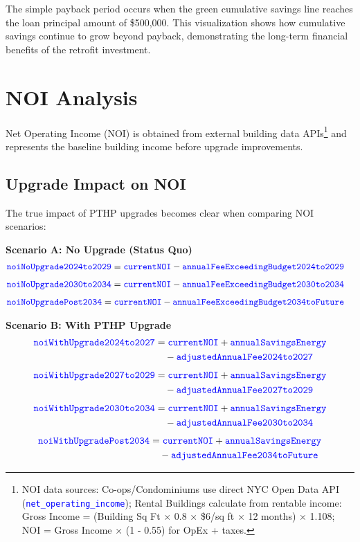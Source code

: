 \documentclass{article}
\newcommand{\code}[1]{\textcolor{blue}{\texttt{#1}}}
\begin{document}
The simple payback period occurs when the green cumulative savings line reaches the loan principal amount of \$500,000. This visualization shows how cumulative savings continue to grow beyond payback, demonstrating the long-term financial benefits of the retrofit investment.

\section{NOI Analysis}

Net Operating Income (NOI) is obtained from external building data APIs\footnote{NOI data sources: Co-ops/Condominiums use direct NYC Open Data API (\code{net\_operating\_income}); Rental Buildings calculate from rentable income: Gross Income = (Building Sq Ft × 0.8 × \$6/sq ft × 12 months) × 1.108; NOI = Gross Income × (1 - 0.55) for OpEx + taxes.} and represents the baseline building income before upgrade improvements.

\subsection{Upgrade Impact on NOI}

The true impact of PTHP upgrades becomes clear when comparing NOI scenarios:

\textbf{Scenario A: No Upgrade (Status Quo)}
\begin{align}
\code{noiNoUpgrade2024to2029} &= \code{currentNOI} - \code{annualFeeExceedingBudget2024to2029}
\end{align}
\begin{align}
\code{noiNoUpgrade2030to2034} &= \code{currentNOI} - \code{annualFeeExceedingBudget2030to2034}
\end{align}
\begin{align}
\code{noiNoUpgradePost2034} &= \code{currentNOI} - \code{annualFeeExceedingBudget2034toFuture}
\end{align}

\textbf{Scenario B: With PTHP Upgrade}
\begin{align}
\code{noiWithUpgrade2024to2027} &= \code{currentNOI} + \code{annualSavingsEnergy} \nonumber\\
&\quad - \code{adjustedAnnualFee2024to2027}
\end{align}
\begin{align}
\code{noiWithUpgrade2027to2029} &= \code{currentNOI} + \code{annualSavingsEnergy} \nonumber\\
&\quad - \code{adjustedAnnualFee2027to2029}
\end{align}
\begin{align}
\code{noiWithUpgrade2030to2034} &= \code{currentNOI} + \code{annualSavingsEnergy} \nonumber\\
&\quad - \code{adjustedAnnualFee2030to2034}
\end{align}
\begin{align}
\code{noiWithUpgradePost2034} &= \code{currentNOI} + \code{annualSavingsEnergy} \nonumber\\
&\quad - \code{adjustedAnnualFee2034toFuture}
\end{align}
\end{document}
